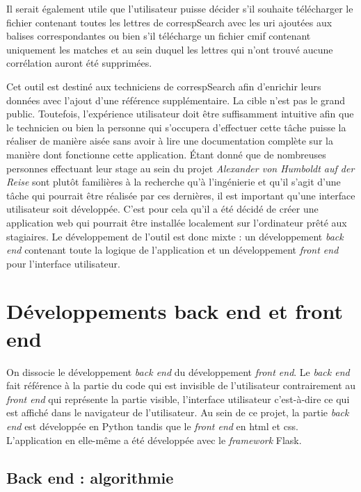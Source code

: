 \documentclass[a4paper, 12pt, twoside]{book}
\begin{document}
Il serait également utile que l'utilisateur puisse décider s'il souhaite télécharger le fichier contenant toutes les lettres de correspSearch avec les \gls{uri} ajoutées aux balises correspondantes ou bien s'il télécharge un fichier \gls{cmif} contenant uniquement les matches et au sein duquel les lettres qui n'ont trouvé aucune corrélation auront été supprimées.

Cet outil est destiné aux techniciens de correspSearch afin d'enrichir leurs données avec l'ajout d'une référence supplémentaire. La cible n'est pas le grand public. Toutefois, l'expérience utilisateur doit être suffisamment intuitive afin que le technicien ou bien la personne qui s'occupera d'effectuer cette tâche puisse la réaliser de manière aisée sans avoir à lire une documentation complète sur la manière dont fonctionne cette application. Étant donné que de nombreuses personnes effectuant leur stage au sein du projet \textit{Alexander von Humboldt auf der Reise} sont plutôt familières à la recherche qu'à l'ingénierie et qu'il s'agit d'une tâche qui pourrait être réalisée par ces dernières, il est important qu'une interface utilisateur soit développée. C'est pour cela qu'il a été décidé de créer une application web qui pourrait être installée localement sur l'ordinateur prêté aux stagiaires. Le développement de l'outil est donc mixte : un développement \textit{back end} contenant toute la logique de l'application et un développement \textit{front end} pour l'interface utilisateur.

\section{Développements back end et front end}
On dissocie le développement \textit{back end} du développement \textit{front end}. Le \textit{back end} fait référence à la partie du code qui est invisible de l'utilisateur contrairement au \textit{front end} qui représente la partie visible, l'interface utilisateur c'est-à-dire ce qui est affiché dans le navigateur de l'utilisateur. Au sein de ce projet, la partie \textit{back end} est développée en Python tandis que le \textit{front end} en \gls{html} et \gls{css}. L'application en elle-même a été développée avec le \textit{framework} Flask. 
\subsection{Back end : algorithmie}
\end{document}
